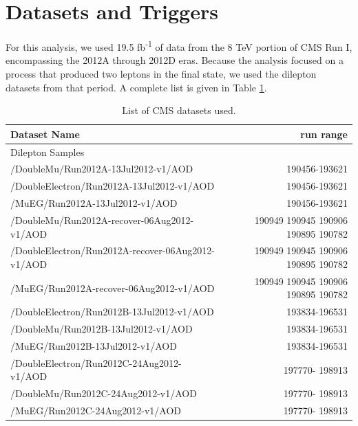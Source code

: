 \section{Datasets and Triggers}
\label{sec:afb:datatrig}

For this analysis, we used 19.5 fb\textsuperscript{-1} of data from
the 8 TeV portion of CMS Run I, encompassing the 2012A through 2012D
eras. Because the analysis focused on a process that produced two
leptons in the final state, we used the dilepton datasets from that
period. A complete list is given in Table \ref{tab:afb:datasamples}.

\begin{table}[!ht]
\begin{center}
\caption{List of CMS datasets used.}
\label{tab:afb:datasamples}
{\footnotesize
\begin{tabular}{l|r}
\hline
Dataset Name & run range \\
\hline\hline
Dilepton Samples \\
\hline

  /DoubleMu/Run2012A-13Jul2012-v1/AOD &  190456-193621 \\
  /DoubleElectron/Run2012A-13Jul2012-v1/AOD & 190456-193621  \\
  /MuEG/Run2012A-13Jul2012-v1/AOD & 190456-193621 \\

  /DoubleMu/Run2012A-recover-06Aug2012-v1/AOD & 190949 190945 190906 190895 190782 \\
  /DoubleElectron/Run2012A-recover-06Aug2012-v1/AOD & 190949 190945 190906 190895 190782 \\
  /MuEG/Run2012A-recover-06Aug2012-v1/AOD & 190949 190945 190906 190895 190782\\

  /DoubleElectron/Run2012B-13Jul2012-v1/AOD  & 193834-196531 \\
  /DoubleMu/Run2012B-13Jul2012-v1/AOD  & 193834-196531  \\
  /MuEG/Run2012B-13Jul2012-v1/AOD  & 193834-196531  \\

  /DoubleElectron/Run2012C-24Aug2012-v1/AOD &  197770- 198913 \\
  /DoubleMu/Run2012C-24Aug2012-v1/AOD &  197770- 198913 \\
  /MuEG/Run2012C-24Aug2012-v1/AOD &  197770- 198913 \\


\end{tabular}}
\end{center}
\end{table}
